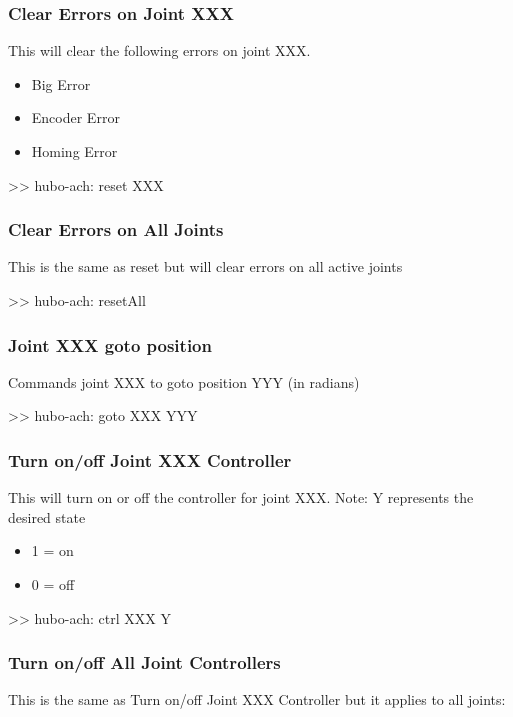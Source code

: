 \subsubsection{Clear Errors on Joint XXX}
This will clear the following errors on joint XXX.
\begin{itemize}
\item Big Error
\item Encoder Error
\item Homing Error
\end{itemize}

\begin{code}
>> hubo-ach: reset XXX
\end{code}



\subsubsection{Clear Errors on All Joints}
This is the same as reset but will clear errors on all active joints
\begin{code}
>> hubo-ach: resetAll
\end{code}



\subsubsection{Joint XXX goto position}
Commands joint XXX to goto position YYY (in radians)
\begin{code}
>> hubo-ach: goto XXX YYY
\end{code}

\subsubsection{Turn on/off Joint XXX Controller}
This will turn on or off the controller for joint XXX.
Note: Y represents the desired state
\begin{itemize}
\item 1 = on
\item 0 = off
\end{itemize}

\begin{code}
>> hubo-ach: ctrl XXX Y
\end{code}






\subsubsection{Turn on/off All Joint Controllers}
This is the same as Turn on/off Joint XXX Controller but it applies to all joints:

